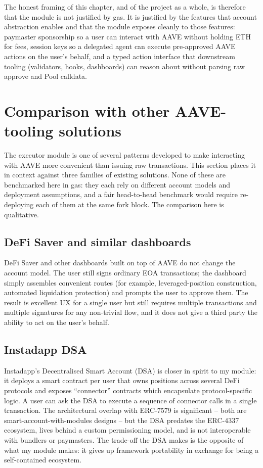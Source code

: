 The honest framing of this chapter, and of the project as a whole, is
therefore that the module is not justified by gas. It is justified by the
features that account abstraction enables and that the module exposes
cleanly to those features: paymaster sponsorship so a user can interact with
AAVE without holding ETH for fees, session keys so a delegated agent can
execute pre-approved AAVE actions on the user's behalf, and a typed action
interface that downstream tooling (validators, hooks, dashboards) can reason
about without parsing raw approve and Pool calldata.

\section{Comparison with other AAVE-tooling solutions}

The executor module is one of several patterns developed to make interacting
with AAVE more convenient than issuing raw transactions. This section places
it in context against three families of existing solutions. None of these
are benchmarked here in gas: they each rely on different account models and
deployment assumptions, and a fair head-to-head benchmark would require
re-deploying each of them at the same fork block. The comparison here is
qualitative.

\subsection{DeFi Saver and similar dashboards}

DeFi Saver and other dashboards built on top of AAVE do not change the
account model. The user still signs ordinary EOA transactions; the dashboard
simply assembles convenient routes (for example, leveraged-position
construction, automated liquidation protection) and prompts the user to
approve them. The result is excellent UX for a single user but still
requires multiple transactions and multiple signatures for any non-trivial
flow, and it does not give a third party the ability to act on the user's
behalf.

\subsection{Instadapp DSA}

Instadapp's Decentralised Smart Account (DSA) is closer in spirit to my
module: it deploys a smart contract per user that owns positions across
several DeFi protocols and exposes ``connector'' contracts which encapsulate
protocol-specific logic. A user can ask the DSA to execute a sequence of
connector calls in a single transaction. The architectural overlap with
ERC-7579 is significant -- both are smart-account-with-modules designs --
but the DSA predates the ERC-4337 ecosystem, lives behind a custom
permissioning model, and is not interoperable with bundlers or paymasters.
The trade-off the DSA makes is the opposite of what my module makes: it
gives up framework portability in exchange for being a self-contained
ecosystem.

